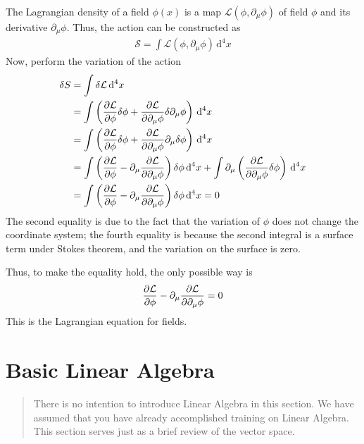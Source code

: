 \documentclass[letterpaper,10pt,english]{sphinxmanual}
\begin{document}
The Lagrangian density of a field \(\phi(x)\) is a map \(\mathcal L(\phi,\partial_\mu\phi)\) of field \(\phi\) and its derivative \(\partial_\mu\phi\). Thus, the action can be constructed as
\begin{equation*}
\begin{split}\mathcal S = \int \mathcal L(\phi,\partial_\mu\phi)\,\mathrm d^4x\end{split}
\end{equation*}
Now, perform the variation of the action
\begin{equation*}
\begin{split}\delta S &= \int \delta\mathcal L \,\mathrm d^4x\\
&= \int \left({\partial\mathcal L\over \partial \phi}\delta\phi + {\partial\mathcal L\over\partial\partial_\mu\phi}\delta\partial_\mu\phi\right)\,\mathrm d^4x\\
&= \int \left({\partial\mathcal L\over \partial \phi}\delta\phi + {\partial\mathcal L\over\partial\partial_\mu\phi}\partial_\mu\delta\phi\right)\,\mathrm d^4x\\
&= \int \left({\partial\mathcal L\over \partial \phi} - \partial_\mu {\partial\mathcal L\over\partial\partial_\mu\phi}\right)\delta\phi\,\mathrm d^4x + \int \partial_\mu \left({\partial\mathcal L\over\partial\partial_\mu\phi}\delta\phi\right)\,\mathrm d^4x\\
&= \int \left({\partial\mathcal L\over \partial \phi} - \partial_\mu {\partial\mathcal L\over\partial\partial_\mu\phi}\right)\delta\phi\,\mathrm d^4x = 0\end{split}
\end{equation*}
The second equality is due to the fact that the variation of \(\phi\) does not change the coordinate system; the fourth equality is because the second integral is a surface term under Stokes theorem, and the variation on the surface is zero.

Thus, to make the equality hold, the only possible way is
\begin{equation*}
\begin{split}{\partial\mathcal L\over \partial \phi} - \partial_\mu {\partial\mathcal L\over\partial\partial_\mu\phi} = 0\end{split}
\end{equation*}
This is the Lagrangian equation for fields.


\section{Basic Linear Algebra}
\label{\detokenize{bg_linalg:basic-linear-algebra}}\label{\detokenize{bg_linalg::doc}}\begin{quote}

There is no intention to introduce Linear Algebra in this section. We have assumed that you have already accomplished training on Linear Algebra. This section serves just as a brief review of the vector space.
\end{quote}
\end{document}
